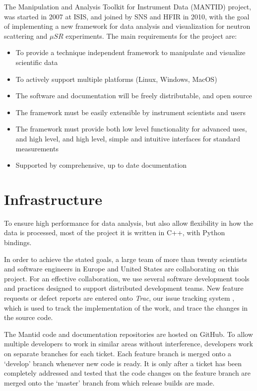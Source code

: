 \documentclass{elsarticle}
\begin{document}
The Manipulation and Analysis Toolkit for Instrument Data (MANTID) project, was started in 2007 at ISIS, and joined by SNS and HFIR in 2010, with the goal of implementing a new framework for data analysis and visualization for neutron scattering and $\mu SR$ experiments. The main requirements for the project are:
\begin{itemize}
\item To provide a technique independent framework to manipulate and visualize scientific data 
\item To actively support multiple platforms (Linux, Windows, MacOS)
\item The software and documentation will be freely distributable, and open source
\item The framework must be easily extensible by instrument scientists and users
\item The framework must provide both low level functionality for advanced uses, and high level, and high level, simple and intuitive interfaces for standard measurements 
\item Supported by comprehensive, up to date documentation
\end{itemize}
 


\section{Infrastructure}
\label{infrastructure}
To ensure high performance for data analysis, but also allow flexibility in how the data is processed, most of the project it is written in C++, with Python bindings.
 
In order to achieve the stated goals, a large team of more than twenty scientists and software engineers in Europe and United States are collaborating on this project. For an effective collaboration, we use several software development tools and practices designed to support distributed development teams. New feature requests or defect reports are entered onto \textit{Trac}, our issue tracking system \cite{trac}, which is used to track the implementation of the work, and trace the changes in the source code.
 
The Mantid code and documentation repositories are hosted on GitHub\cite{github}. To allow multiple developers to work in similar areas without interference, developers work on separate branches for each ticket. Each feature branch is merged onto a `develop' branch whenever new code is ready.
It is only after a ticket has been completely addressed and tested that the code changes on the feature branch are merged onto the `master' branch from which release builds are made.
\end{document}
